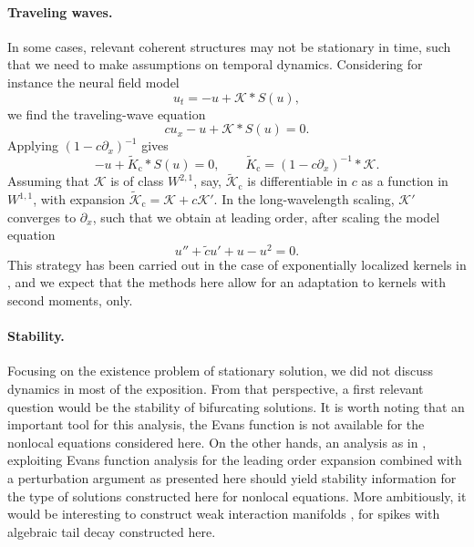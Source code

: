 \documentclass[10pt]{article}
\newcommand{\K}{\mathcal{K}}
\begin{document}
\paragraph{Traveling waves.} In some cases, relevant coherent structures may not be stationary in time, such that we need to make assumptions on temporal dynamics. Considering for instance the neural field model
\[
u_t=-u+\K*S(u),
\]
we find the traveling-wave equation 
\[
cu_x - u + \K*S(u)=0.
\]
Applying $(1-c\partial_x)^{-1}$ gives 
\[
-u+\tilde{K}_\mathrm{c}*S(u)=0,\qquad \tilde{K}_\mathrm{c}=(1-c\partial_x)^{-1}*\K.
\]
Assuming that $\K$ is of class $W^{2,1}$, say, $\tilde{\K}_\mathrm{c}$ is differentiable in $c$ as a function in $W^{1,1}$, with expansion $\tilde{\K}_\mathrm{c}=\K+c\K'$. In the long-wavelength scaling, $\K'$ converges to $\partial_x$, such that we obtain at leading order, after scaling  the model equation 
\[
u''+\tilde{c}u'+u-u^2=0.
\]
This strategy has been carried out in the case of exponentially localized kernels in \cite[\S 4.2]{FScmfd}, and we expect that the methods here allow for an adaptation to kernels with second moments, only. 


\paragraph{Stability.} Focusing on the existence problem of stationary solution, we did not discuss dynamics in most of the exposition. From that perspective, a first relevant question would be the stability of bifurcating solutions. It is worth noting that an important tool for this analysis, the Evans function \cite{evans,agj,sandtw} is not available for the nonlocal equations considered here. On the other hands, an analysis as in \cite{HS2,HS}, exploiting Evans function analysis for the leading order expansion combined with a perturbation argument as presented here should yield stability information for the type of solutions constructed here for nonlocal equations. More ambitiously, it would be interesting to construct weak interaction manifolds \cite{bz,sandtw,mz}, for spikes with algebraic tail decay constructed here. 








\small
\end{document}

